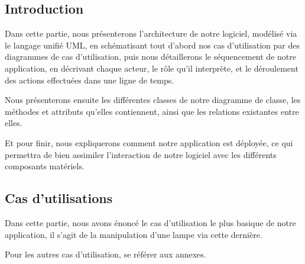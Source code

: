 \documentclass[12pt,a4paper]{article}
\begin{document}
\subsection{Introduction}
Dans cette partie, nous présenterons l'architecture de notre logiciel, modélisé via le langage unifié UML, en schématisant tout d'abord nos cas d'utilisation par des diagrammes de cas d'utilisation, puis nous détaillerons le séquencement de notre application, en décrivant chaque acteur, le rôle qu'il interprète, et le déroulement des actions effectuées dans une ligne de temps.\par
Nous présenterons ensuite les différentes classes de notre diagramme de classe, les méthodes et attributs qu'elles contiennent, ainsi que les relations existantes entre elles.\par
Et pour finir, nous expliquerons comment notre application est déployée, ce qui permettra de bien assimiler l'interaction de notre logiciel avec les différents composants matériels.\par
\subsection{Cas d'utilisations}
Dans cette partie, nous avons énoncé le cas d'utilisation le plus basique de notre application, il s'agit de la manipulation d'une lampe via cette dernière.\par
Pour les autres cas d'utilisation, se référer aux annexes.
\end{document}
